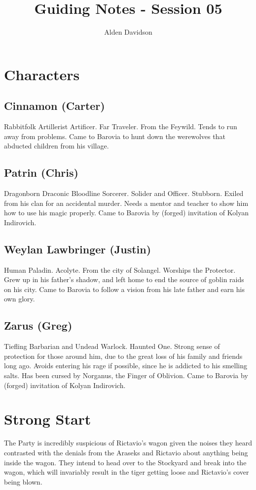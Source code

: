 \documentclass[a4paper,11pt]{article}
\title{Guiding Notes - Session 05}
\author{Alden Davidson}
\begin{document}
\maketitle
\tableofcontents

\pagebreak
\section{Characters}
\label{sec:Characters}
\subsection{Cinnamon (Carter)}
  Rabbitfolk Artillerist Artificer. Far Traveler. From the Feywild. Tends to run away from problems. Came to
  Barovia to hunt down the werewolves that abducted children from his village.
\subsection{Patrin (Chris)}
  Dragonborn Draconic Bloodline Sorcerer. Solider and Officer. Stubborn. Exiled from his clan for an accidental 
  murder. Needs a mentor and teacher to show him how to use his magic properly. Came to Barovia by (forged)
  invitation of Kolyan Indirovich.
\subsection{Weylan Lawbringer (Justin)}
  Human Paladin. Acolyte. From the city of Solangel. Worships the Protector. Grew up in his father's shadow, and 
  left home to end the source of goblin raids on his city. Came to Barovia to follow a vision from his late 
  father and earn his own glory.
\subsection{Zarus (Greg)}
  Tiefling Barbarian and Undead Warlock. Haunted One. Strong sense of protection for those around him, due to the
  great loss of his family and friends long ago. Avoids entering his rage if possible, since he is addicted to 
  his smelling salts. Has been cursed by Norganus, the Finger of Oblivion. Came to Barovia by (forged) 
  invitation of Kolyan Indirovich.


\pagebreak
\section{Strong Start}
\label{sec:StrongStart}
The Party is incredibly suspicious of Rictavio's wagon given the noises they heard contrasted with the denials 
from the Araseks and Rictavio about anything being inside the wagon. They intend to head over to the Stockyard and 
break into the wagon, which will invariably result in the tiger getting loose and Rictavio's cover being blown.
\end{document}
